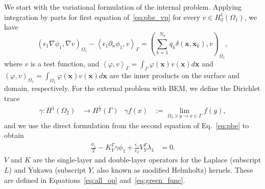    We start with the variational formulation of the internal problem. Applying integration by parts for first equation of~\eqref{eq:pbe_vp} for every $v \in H_0^1(\Omega_1)$, we have
% 
\begin{equation}
\label{eq:fem}
 \left( \epsilon_1 \nabla \phi_1, \nabla v \right)_{\Omega_1}  -  \left<  \epsilon_1\partial_n \phi_1, v \right>_\Gamma =  \left( \sum_{k=1}^{N_q} q_k\delta(\mathbf{x},\mathbf{x}_k),  v\right)_{\Omega_1},
\end{equation}
%
where $v$ is a test function, and $\left<\varphi,v\right>_\Gamma = \int_\Gamma \varphi(\mathbf{x})v(\mathbf{x})d\mathbf{x}$ and $\left(\varphi,v\right)_{\Omega_1} = \int_{\Omega_1} \varphi(\mathbf{x})v(\mathbf{x})d\mathbf{x}$ are the inner products on the surface and domain, respectively.
For the external problem with BEM, we define the Dirichlet trace~\cite{MR2361676} 
\begin{align*}
\gamma:  H^1(\Omega_2) &\rightarrow H^{\frac{1}{2}}(\Gamma) & \gamma f(x) & := \lim_{\Omega_2 \ni y \rightarrow x \in \Gamma}  f(y),
\end{align*}
and we use the direct formulation from the second equation of Eq.~\eqref{eq:pbe} to obtain
\begin{align*}
\tfrac{\phi_1}{2} - K_{Y}^{\Gamma}\gamma \phi_1 + \tfrac{\epsilon_1}{\epsilon_2}V_{Y}^{\Gamma}  \lambda_1 & = 0.
\end{align*}
$V$ and $K$ are the single-layer and double-layer operators for the Laplace (subscript $L$) and Yukawa (subscript $Y$, also known as modified Helmholtz) kernels. These are defined in Equations~\eqref{eq:all_op} and~\eqref{eq:green_func}.
%
%
%
%

